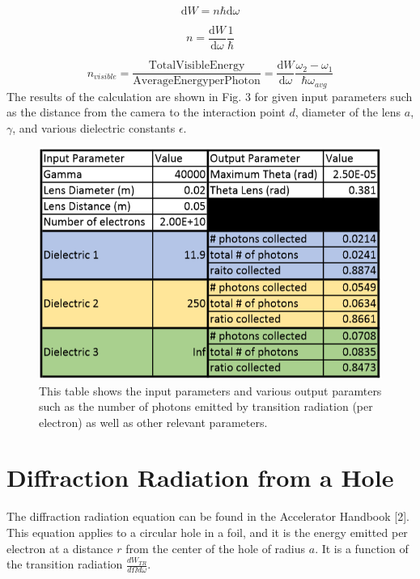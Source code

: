 \documentclass[12pt]{article}
\begin{document}
\begin{equation}
\mathrm{d} W=n \hbar \mathrm{d} \omega
\end{equation}

\begin{equation}
n=\frac{\mathrm{d} W}{\mathrm{d} \omega} \frac{1}{\hbar}
\end{equation}

\begin{equation}
n_{visible}=\frac{\mathrm{Total Visible Energy}}{\mathrm{Average Energy per Photon}}=\frac{\mathrm{d} W}{\mathrm{d} \omega} \frac{\omega_2 - \omega_1}{\hbar \omega_{avg}}
\end{equation}
The results of the calculation are shown in Fig. 3 for given input parameters such as the distance from the camera to the interaction point $d$, diameter of the lens $a$, $\gamma$, and various dielectric constants $\epsilon$.

\begin{figure}
\begin{center}
\includegraphics[scale=0.5]{TransData.PNG}
\caption{This table shows the input parameters and various output paramters such as the number of photons emitted by transition radiation (per electron) as well as other relevant parameters.}
\end{center}
\end{figure}

\section{Diffraction Radiation from a Hole}

The diffraction radiation equation can be found in the Accelerator Handbook [2]. This equation applies to a circular hole in a foil, and it is the energy emitted per electron at a distance $r$ from the center of the hole of radius $a$. It is a function of the transition radiation $\frac{dW_{TR}} {d \Omega d \omega}$.
\end{document}
